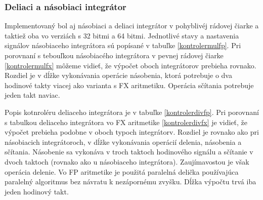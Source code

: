 \subsubsection*{Deliaci a násobiaci integrátor}
Implementovaný bol aj násobiaci a deliaci integrátor v pohyblivéj rádovej čiarke a taktiež oba vo verziách s 32 bitmi a 64 bitmi. Jednotlivé stavy a nastavenia signálov násobiaceho integrátora sú popísané v tabuľke \ref{kontrolermulfp}. Pri porovnaní s tebouľkou násobiacého integrátora v pevnej rádovej čiarke \ref{kontrolermulfx} môžeme vidieť, že výpočet oboch integrátorov prebieha rovnako. Rozdiel je v dĺžke vykonávania operácie násobenia, ktorá potrebuje o dva hodinové takty viacej ako varianta s FX aritmetiku. Operácia sčítania potrebuje jeden takt naviac.

Popis kotnroléru deliaceho integrátora je v tabuľke \ref{kontrolerdivfp}. Pri porovnaní s tabulkou deliaceho integrátora vo FX aritmetike \ref{kontrolerdivfx} je vidieť, že výpočet prebieha podobne v oboch typoch integrátorv. Rozdiel je rovnako ako pri násobiacich integrátoroch, v dĺžke vykonávania operácií delenia, násobenia a sčítania. Násobenie sa vykonáva v troch taktoch hodinového signálu a sčítanie v dvoch taktoch (rovnako ako u násobiaceho integrátora). Zaujímavostou je však operácia delenie. Vo FP aritmetike je použitá paralelná delička používajúca paralelný algoritmus bez návratu k nezápornému zvyšku. Dĺžka výpočtu trvá iba jeden hodinový takt.






